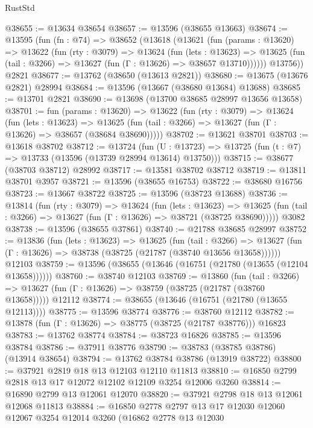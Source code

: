\begin{lexlean}{RustStd}
\begin{coremodule}
@38655 := @13634 @38654
@38657 := @13596 (@38655 @13663)
@38674 := @13595
    (fun (fn : @74) =>
    @38652
      (@13618
        (@13621
          (fun (params : @13620) =>
          @13622
            (fun (rty : @3079) =>
            @13624
              (fun (lets : @13623) =>
              @13625 (fun (tail : @3266) => @13627 (fun (Γ : @13626) => @38657 @13710))))))
        @13756))
    @2821
@38677 := @13762 (@38650 (@13613 @2821))
@38680 := @13675 (@13676 @2821) @28994
@38684 := @13596 (@13667 (@38680 @13684) @13688)
@38685 := @13701 @2821
@38690 := @13698 (@13700 @38685 @28997 @13656 @13658)
@38701 := fun (params : @13620) =>
  @13622
    (fun (rty : @3079) =>
    @13624
      (fun (lets : @13623) =>
      @13625 (fun (tail : @3266) => @13627 (fun (Γ : @13626) => @38657 (@38684 @38690)))))
@38702 := @13621 @38701
@38703 := @13618 @38702
@38712 := @13724
    (fun (U : @13723) => @13725 (fun (t : @7) => @13733 (@13596 (@13739 @28994 @13614) @13750)))
@38715 := @38677 (@38703 @38712) @28992
@38717 := @13581 @38702 @38712
@38719 := @13811 @38701 @3957
@38721 := @13596 (@38655 @16753)
@38722 := @38680 @16756
@38723 := @13667 @38722
@38725 := @13596 (@38723 @13688)
@38736 := @13814
    (fun (rty : @3079) =>
    @13624
      (fun (lets : @13623) =>
      @13625 (fun (tail : @3266) => @13627 (fun (Γ : @13626) => @38721 (@38725 @38690)))))
    @3082
@38738 := @13596 (@38655 @37861)
@38740 := @21788 @38685 @28997
@38752 := @13836
    (fun (lets : @13623) =>
    @13625
      (fun (tail : @3266) =>
      @13627 (fun (Γ : @13626) => @38738 (@38725 (@21787 (@38740 @13656 @13658))))))
    @12103
@38759 := @13596 (@38655 (@13646 (@16751 (@21780 (@13655 (@12104 @13658))))))
@38760 := @38740 @12103
@38769 := @13860
    (fun (tail : @3266) => @13627 (fun (Γ : @13626) => @38759 (@38725 (@21787 (@38760 @13658)))))
    @12112
@38774 := @38655 (@13646 (@16751 (@21780 (@13655 @12113))))
@38775 := @13596 @38774
@38776 := @38760 @12112
@38782 := @13878 (fun (Γ : @13626) => @38775 (@38725 (@21787 @38776))) @16823
@38783 := @13762 @38774
@38784 := @38723 @16826
@38785 := @13596 @38784
@38786 := @37911 @38776
@38790 := @38783 (@38785 @38786) (@13914 @38654)
@38794 := @13762 @38784 @38786 (@13919 @38722)
@38800 := @37921 @2819 @18 @13 @12103 @12110 @11813
@38810 := @16850 @2799 @2818 @13 @17 @12072 @12102 @12109 @3254 @12006 @3260
@38814 := @16890 @2799 @13 @12061 @12070
@38820 := @37921 @2798 @18 @13 @12061 @12068 @11813
@38884 := @16850
    @2778
    @2797
    @13
    @17
    @12030
    @12060
    @12067
    @3254
    @12014
    @3260
    (@16862
      @2778
      @13
      @12030

\end{coremodule}
\end{lexlean}
